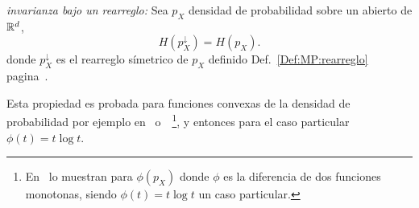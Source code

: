 
\begin{propiedadesC}\setcounter{enumi}{\value{PropPermutacion}}
\item\label{Prop:SZ:permutacionC} {\it invarianza  bajo un rearreglo:} Sea $p_X$
  densidad de probabilidad sobre un abierto de $\mathbb{R}^d$,
  \[
  H\left( p_X^\downarrow \right) = H(p_X).
  \]
  donde  $p_X^\downarrow$   es  el  rearreglo  s\'imetrico   de  $p_X$  definido
  Def.~\ref{Def:MP:rearreglo} pagina~\pageref{Def:MP:rearreglo}.
\end{propiedadesC}
%
\noindent Esta  propiedad es probada para  funciones convexas de  la densidad de
probabilidad              por             ejemplo             en~\cite{LieLos01}
o~\cite[Lema~7.2]{WanMad04}~\footnote{En~\cite[Sec.~3.3]{LieLos01}  lo  muestran
  para $\phi(p_X)$  donde $\phi$  es la diferencia  de dos  funciones monotonas,
  siendo $\phi(t)  = t  \log t$ un  caso particular.},  y entonces para  el caso
particular $\phi(t) = t \log t$.

